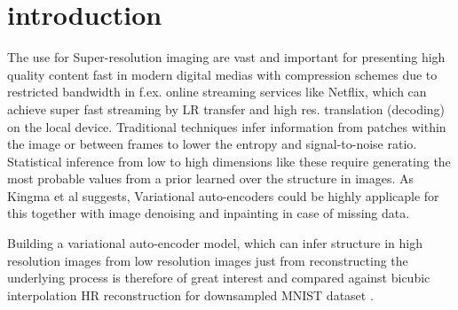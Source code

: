 \section{introduction}
\label{sec:introduction}

The use for Super-resolution imaging are vast and important for presenting high quality content fast in modern digital medias with compression schemes due to restricted bandwidth in f.ex. online streaming services like Netflix, which can achieve super fast streaming by LR transfer and high res. translation (decoding) on the local device. Traditional techniques infer information from patches within the image or between frames to lower the entropy and signal-to-noise ratio.
Statistical inference from low to high dimensions like these require generating the most probable values from a prior learned over the structure in images. As Kingma et al \cite{Kingma2013} suggests, Variational auto-encoders could be highly applicaple for this together with image denoising and inpainting in case of missing data.

Building a variational auto-encoder model, which can infer structure in high resolution images from low resolution images just from reconstructing the underlying process is therefore of great interest and compared against bicubic interpolation HR reconstruction for downsampled MNIST dataset \cite{MNIST}.
 